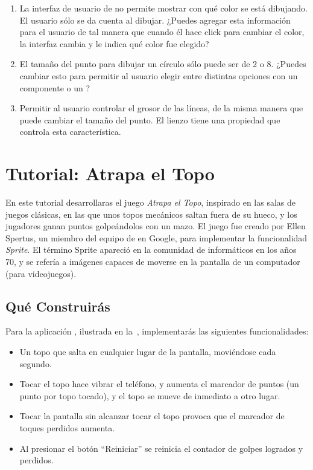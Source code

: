 \begin{enumerate}

\item La interfaz de usuario de  no permite mostrar
  con qué color se está dibujando. El usuario sólo se da cuenta al
  dibujar. ¿Puedes agregar esta información para el usuario de tal
  manera que cuando él hace click para cambiar el color, la interfaz
  cambia y le indica qué color fue elegido?

\item El tamaño del punto para dibujar un círculo sólo puede ser de 2
  o 8.  ¿Puedes cambiar esto para permitir al usuario elegir entre
  distintas opciones con un componente  o un
  ?

\item Permitir al usuario controlar el grosor de las líneas, de la
  misma manera que puede cambiar el tamaño del punto. El lienzo tiene
  una propiedad  que controla esta
  característica.
\end{enumerate}

\section{Tutorial: Atrapa el Topo}

En este tutorial desarrollaras el juego \emph{Atrapa el Topo},
inspirado en las salas de juegos clásicas, en las que unos topos
mecánicos saltan fuera de su hueco, y los jugadores ganan puntos
golpeándolos con un mazo. El juego fue creado por Ellen Spertus, un
miembro del equipo de \AppInventor en Google, para implementar la
funcionalidad \emph{Sprite}. El término Sprite apareció en la
comunidad de informáticos en los años 70, y se refería a imágenes
capaces de moverse en la pantalla de un computador (para videojuegos).

\subsection*{Qué Construirás}

Para la aplicación , ilustrada en
la~, implementarás las siguientes funcionalidades:

\begin{itemize}

\item Un topo que salta en cualquier lugar de la pantalla, moviéndose
  cada segundo.

\item Tocar el topo hace vibrar el teléfono, y aumenta el marcador de
  puntos (un punto por topo tocado), y el topo se mueve de inmediato a
  otro lugar.

\item Tocar la pantalla sin alcanzar tocar el topo provoca que el
  marcador de toques perdidos aumenta.

\item Al presionar el botón ``Reiniciar'' se reinicia el contador de
  golpes logrados y perdidos.

\end{itemize}

